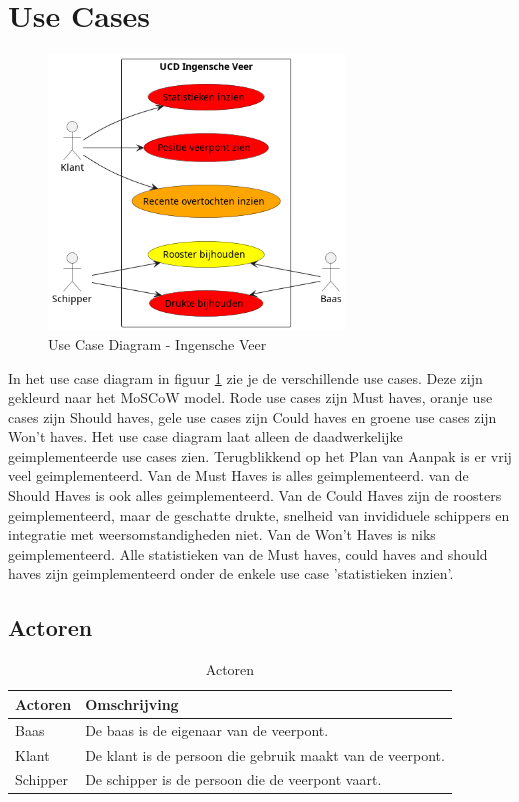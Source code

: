 \documentclass{article}
\begin{document}
\section{Use Cases}
\begin{figure}[H]
    \centering
    \includegraphics[width=0.7\textwidth]{images/ucd.png}
    \caption{Use Case Diagram - Ingensche Veer}
    \label{fig:ucd}
\end{figure}

In het use case diagram in figuur \ref{fig:ucd} zie je de verschillende use cases. Deze zijn gekleurd naar het MoSCoW model. Rode use cases zijn Must haves, oranje use cases zijn Should haves, gele use cases zijn Could haves en groene use cases zijn Won't haves.
Het use case diagram laat alleen de daadwerkelijke geimplementeerde use cases zien. 
Terugblikkend op het Plan van Aanpak is er vrij veel geimplementeerd.
Van de Must Haves is alles geimplementeerd. van de Should Haves is ook alles geimplementeerd. Van de Could Haves zijn de roosters geimplementeerd, maar de geschatte drukte, snelheid van invididuele schippers en integratie met weersomstandigheden niet. Van de Won't Haves is niks geimplementeerd.
Alle statistieken van de Must haves, could haves and should haves zijn geimplementeerd onder de enkele use case 'statistieken inzien'.


\subsection{Actoren}

\begin{table}[H]
    \centering
    \begin{tabularx}{\textwidth}{|l|X|}
        \hline
        \textbf{Actoren} & \textbf{Omschrijving}  \\
        \hline
        Baas & De baas is de eigenaar van de veerpont. \\
        \hline
        Klant  & De klant is de persoon die gebruik maakt van de veerpont. \\
        \hline
        Schipper & De schipper is de persoon die de veerpont vaart. \\
        \hline

    \end{tabularx}
    \caption{Actoren}
\end{table}
\end{document}
